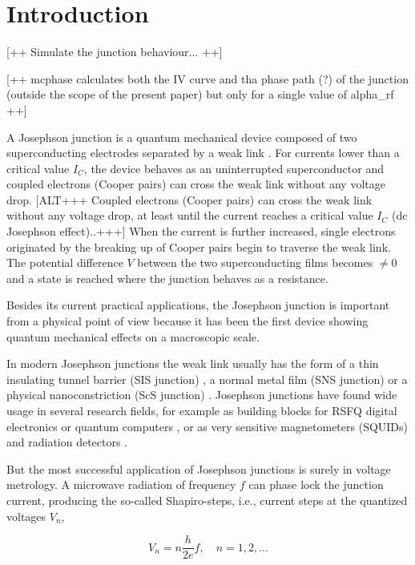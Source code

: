 \section{Introduction}


[++ Simulate the junction behaviour... ++]

[++ mcphase calculates both the IV curve and tha phase path (?) of the junction (outside the scope of the present paper) but only for a single value of alpha_rf ++]

A Josephson junction is a quantum mechanical device composed of two superconducting electrodes separated by a weak link \cite{Barone:1982}.
For currents lower than a critical value $I_C$, the device behaves as an uninterrupted superconductor and coupled electrons (Cooper pairs) can cross the weak link without any voltage drop.
[ALT+++ Coupled electrons (Cooper pairs) can cross the weak link without any voltage drop, at least until the current reaches a critical value $I_C$ (dc Josephson effect)..+++]
When the current is further increased, single electrons originated by the breaking up of Cooper pairs begin to traverse the weak link. The potential difference $V$ between the two superconducting films becomes $\neq 0$ and a state is reached where the junction behaves as a resistance.

Besides its current practical applications, the Josephson junction is important from a physical point of view because it has been the first device showing quantum mechanical effects on a macroscopic scale.

In modern Josephson junctions the weak link usually has the form of a thin insulating tunnel barrier (SIS junction) \cite{Gurvitch:1983}, a normal metal film (SNS junction) \cite{Benz:1995} or a physical nanoconstriction (ScS junction) \cite{Cybart:2015, DeLeo:2016}. Josephson junctions have found wide usage in several research fields, for example as building blocks for RSFQ digital electronics  or quantum computers \cite{Likharev:1991}, or as very sensitive magnetometers (SQUIDs) and radiation detectors \cite{Maggi:2006b, Granata:2015}.

But the most successful application of Josephson junctions is surely in voltage metrology.
A microwave radiation of frequency $f$ can phase lock the junction current, producing the so-called Shapiro-steps, i.e., current steps at the quantized voltages $V_n$, 

\begin{equation}
	V_n = n \frac{h}{2 e} f, \quad n = 1, 2, ...
\label{eq:voltage_steps}
\end{equation}

